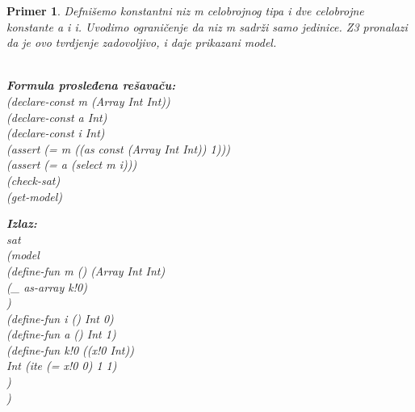 \documentclass[12pt,oneside]{memoir}
\newcommand\tab[1][0.5cm]{\hspace*{#1}}
\newtheorem{primer}{Primer}
\begin{document}
\begin{primer} Defnišemo konstantni niz m celobrojnog tipa i dve celobrojne konstante a i i. Uvodimo ograničenje da niz m sadrži samo jedinice. Z3 pronalazi da je ovo tvrdjenje zadovoljivo, i daje prikazani model.\\ \\
\begin{minipage}[b]{0.55\textwidth}
\textbf{Formula prosleđena rešavaču:}
\\(declare-const m (Array Int Int))
\\(declare-const a Int)
\\(declare-const i Int)
\\(assert (= m ((as const (Array Int Int)) 1)))
\\(assert (= a (select m i)))
\\(check-sat)
\\(get-model)
\end{minipage}
\hspace{1.1cm} 
\begin{minipage}[t]{0.5\textwidth}
\vspace{-4.65cm}
\textbf{Izlaz:}
\\sat 
\\(model 
\\\tab(define-fun m () (Array Int Int) 
\\\tab\tab(\_ as-array k!0)
\\\tab) 
\\\tab(define-fun i () Int 0) 
\\\tab(define-fun a () Int 1) 
\\\tab(define-fun k!0 ((x!0 Int)) 
\\\tab\tab Int (ite (= x!0 0) 1 1)
\\\tab)
\\)
\end{minipage}
\end{primer}
\end{document}
